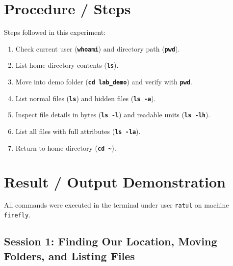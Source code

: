 \documentclass[10pt,a4paper,portrait]{article}
\newcommand{\cmd}[1]{\texttt{\textbf{#1}}}
\begin{document}
\section{Procedure / Steps}
Steps followed in this experiment:
\begin{enumerate}[noitemsep,topsep=1pt,leftmargin=1.4em]
  \item Check current user (\cmd{whoami}) and directory path (\cmd{pwd}).
  \item List home directory contents (\cmd{ls}).
  \item Move into demo folder (\cmd{cd lab\_demo}) and verify with \cmd{pwd}.
  \item List normal files (\cmd{ls}) and hidden files (\cmd{ls -a}).
  \item Inspect file details in bytes (\cmd{ls -l}) and readable units (\cmd{ls -lh}).
  \item List all files with full attributes (\cmd{ls -la}).
  \item Return to home directory (\cmd{cd \textasciitilde}).
\end{enumerate}

\newpage

\section{Result / Output Demonstration}
All commands were executed in the terminal under user \texttt{ratul} on machine \texttt{firefly}.

\subsection{Session 1: Finding Our Location, Moving Folders, and Listing Files}
\end{document}
